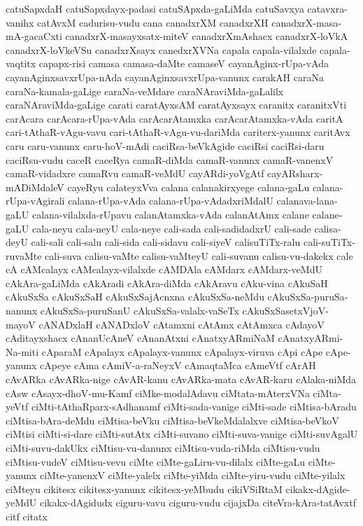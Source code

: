 {catuSapxdaH
catuSapxdayx-padasi
catuSApxda-gaLiMda
catuSavxya
catavxra-vanihx
catAvxM
cadurisu-vudu
cana
canadxrXM
canadxrXH
canadxrX-masa-mA-gacaCxti
canadxrX-masayxsatx-miteV
canadxrXmAshacx
canadxrX-loVkA
canadxrX-loVkeVSu
canadxrXsayx
canedxrXVNa
capala
capala-vilalxde
capala-vaqtitx
capapx-risi
camasa
camasa-daMte
camaseV
cayanAginx-rUpa-vAda
cayanAginxsavxrUpa-nAda
cayanAginxsavxrUpa-vanunx
carakAH
caraNa
caraNa-kamala-gaLige
caraNa-veMdare
caraNAraviMda-gaLalilx
caraNAraviMda-gaLige
carati
caratAyxsAM
caratAyxsayx
caranitx
caranitxVti
carAcara
carAcara-rUpa-vAda
carAcarAtamxka
carAcarAtamxka-vAda
caritA
cari-tAthaR-vAgu-vavu
cari-tAthaR-vAgu-vu-dariMda
cariterx-yanunx
caritAvx
caru
caru-vanunx
caru-hoV-mAdi
caciRsa-beVkAgide
caciRsi
caciRsi-daru
caciRsu-vudu
caceR
caceRya
camaR-diMda
camaR-vanunx
camaR-vanenxV
camaR-vidadxre
camaRvu
camaR-veMdU
cayARdi-yoVgAtf
cayARsharx-mADiMdaleV
cayeRyu
calateyxVva
calana
calanakirxyege
calana-gaLu
calana-rUpa-vAgirali
calana-rUpa-vAda
calana-rUpa-vAdadxriMdalU
calanava-lana-gaLU
calana-vilalxda-rUpavu
calanAtamxka-vAda
calanAtAmx
calane
calane-gaLU
cala-neyu
cala-neyU
cala-neye
cali-sada
cali-sadidadxrU
cali-sade
calisa-deyU
cali-sali
cali-salu
cali-sida
cali-sidavu
cali-siyeV
calisuTiTx-ralu
cali-suTiTx-ruvaMte
cali-suva
calisu-vaMte
calisu-vaMteyU
cali-suvanu
calisu-vu-dakekx
cale
cA
cAMcalayx
cAMcalayx-vilalxde
cAMDAla
cAMdarx
cAMdarx-veMdU
cAkAra-gaLiMda
cAkAradi
cAkAra-diMda
cAkAravu
cAku-vina
cAkuSaH
cAkuSxSa
cAkuSxSaH
cAkuSxSajAcnxna
cAkuSxSa-neMdu
cAkuSxSa-puruSa-nanunx
cAkuSxSa-puruSanU
cAkuSxSa-valalx-vaSeTx
cAkuSxSasetxVjoV-mayoV
cANADxlaH
cANADxloV
cAtamxni
cAtAmx
cAtAmxca
cAdayoV
cAditayxshacx
cAnanUcAneV
cAnanAtxni
cAnatxyARmiNaM
cAnatxyARmi-Na-miti
cAparaM
cApalayx
cApalayx-vanunx
cApalayx-viruva
cApi
cApe
cApe-yanunx
cApeye
cAma
cAmiV-a-raNeyxV
cAmaqtaMca
cAmeVtf
cArAH
cAvARka
cAvARka-nige
cAvAR-kanu
cAvARka-mata
cAvAR-karu
cAlaka-niMda
cAsw
cAsayx-dhoV-mu-Kamf
ciMke-modalAdavu
ciMtata-mAterxVNa
ciMta-yeVtf
ciMti-tAthaRparx-sAdhanamf
ciMti-sada-vanige
ciMti-sade
ciMtisa-bAradu
ciMtisa-bAra-deMdu
ciMtisa-beVku
ciMtisa-beVkeMdalalxve
ciMtisa-beVkoV
ciMtisi
ciMti-si-dare
ciMti-sutAtx
ciMti-suvano
ciMti-suva-vanige
ciMti-suvAgalU
ciMti-suvu-dakUkx
ciMtisu-vu-danunx
ciMtisu-vuda-riMda
ciMtisu-vudu
ciMtisu-vudeV
ciMtisu-vevu
ciMte
ciMte-gaLiru-vu-dilalx
ciMte-gaLu
ciMte-yanunx
ciMte-yanenxV
ciMte-yalelx
ciMte-yiMda
ciMte-yiru-vudu
ciMte-yilalx
ciMteyu
cikitesx
cikitesx-yanunx
cikitesx-yeMbudu
cikiVSiRtaM
cikakx-dAgide-yeMdU
cikakx-dAgidudx
ciguru-vavu
ciguru-vudu
cijajxDa
citeVra-kAra-tatAvxtf
citf
citatx
}
